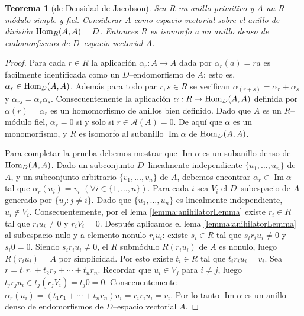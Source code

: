 \documentclass{report}
\newcommand{\Hom}{\textnormal{Hom}}
\DeclareMathOperator{\image}{\text{Im}}
\newtheorem{theorem}{Teorema}
\begin{document}
  \begin{theorem}[de Densidad de Jacobson]
    Sea \(R\) un anillo primitivo y \(A\) un \(R\)--módulo simple y fiel.
    Considerar \(A\) como espacio vectorial sobre el anillo de división \(\Hom_R(A, A) = D\).
    Entonces \(R\) es isomorfo a un anillo denso de endomorfismos de \(D\)--espacio vectorial \(A\).
  \end{theorem}
  \begin{proof}
    Para cada \(r \in R\) la aplicación \(\alpha_r : A \rightarrow A\) dada por \(\alpha_r(a) = r a\) es facilmente identificada como un \(D\)--endomorfismo de \(A\): esto es, \(\alpha_r \in \Hom_D(A, A)\).
    Además para todo par \(r, s \in R\) se verifican \(\alpha_{(r + s)} = \alpha_r + \alpha_s\) y \(\alpha_{r s} = \alpha_r \alpha_s\).
    Consecuentemente la aplicación \(\alpha : R \rightarrow \Hom_D(A, A)\) definida por \(\alpha(r) = \alpha_r\) es un homomorfismo de anillos bien definido.
    Dado que \(A\) es un \(R\)--módulo fiel, \(\alpha_r = 0\) si y solo si \(r \in \mathcal{A}(A) = 0\).
    De aquí que \(\alpha\) es un monomorfismo, y \(R\) es isomorfo al subanillo \(\image \alpha\) de \(\Hom_D(A, A)\).

    Para completar la prueba debemos mostrar que \(\image \alpha\) es un subanillo denso de \(\Hom_D(A, A)\).
    Dado un subconjunto \(D\)--linealmente independiente \(\{u_1, \dots, u_n\}\) de \(A\), y un subconjunto arbitrario \(\{v_1, \dots, v_n\}\) de \(A\), debemos encontrar \(\alpha_r \in \image \alpha\) tal que \(\alpha_r(u_i) = v_i\) \((\forall i \in \{1, \dots, n\})\).
    Para cada \(i\) sea \(V_i\) el \(D\)--subespacio de \(A\) generado por \(\{u_j : j \neq i\}\).
    Dado que \(\{u_1, \dots, u_n\}\) es linealmente independiente, \(u_i \notin V_i\).
    Consecuentemente, por el lema \ref{lemma:anihilatorLemma} existe \(r_i \in R\) tal que \(r_i u_i \neq 0\) y \(r_i V_i = 0\).
    Después aplicamos el lema \ref{lemma:anihilatorLemma} al subespacio nulo y a elemento nonulo \(r_i u_i\):
    existe \(s_i \in R\) tal que \(s_i r_i u_i \neq 0\) y \(s_i 0 = 0\).
    Siendo \(s_i r_i u_i \neq 0\), el \(R\) submódulo \(R (r_i u_i)\) de \(A\) es nonulo, luego \(R(r_i u_i) = A\) por simplicidad.
    Por esto existe \(t_i \in R\) tal que \(t_i r_i u_i = v_i\).
    Sea \(r = t_1 r_1 + t_2 r_2 + \cdots + t_n r_n\).
    Recordar que \(u_i \in V_j\) para \(i \neq j\), luego \(t_j r_j u_i \in t_j (r_j V_i) = t_j 0 = 0\).
    Consecuentemente \(\alpha_r(u_i) = (t_1 r_1 + \cdots + t_n r_n) u_i = r_i r_i u_i = v_i\).
    Por lo tanto \(\image \alpha\) es un anillo denso de endomorfismos de \(D\)--espacio vectorial \(A\).
  \end{proof}
\end{document}
